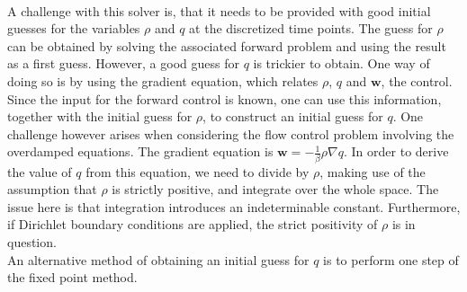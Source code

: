\documentclass[11pt, a4paper]{article}
\theoremstyle{definition}
\newcommand{\adj}{q}
\begin{document}
\\
A challenge with this solver is, that it needs to be provided with good initial guesses for the variables $\rho$ and $\adj$ at the discretized time points. The guess for $\rho$ can be obtained by solving the associated forward problem and using the result as a first guess. However, a good guess for $\adj$ is trickier to obtain. One way of doing so is by using the gradient equation, which relates $\rho$, $\adj$ and $\mathbf w$, the control. Since the input for the forward control is known, one can use this information, together with the initial guess for $\rho$, to construct an initial guess for $\adj$. 
One challenge however arises when considering the flow control problem involving the overdamped equations. The gradient equation is $\mathbf{w} = - \frac{1}{\beta} \rho\nabla \adj$. In order to derive the value of $\adj$ from this equation, we need to divide by $\rho$, making use of the assumption that $\rho$ is strictly positive, and integrate over the whole space. The issue here is that integration introduces an indeterminable constant. Furthermore, if Dirichlet boundary conditions are applied, the strict positivity of $\rho$ is in question.\\
An alternative method of obtaining an initial guess for $\adj$ is to perform one step of the fixed point method.
\end{document}
